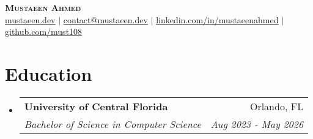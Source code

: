 \documentclass[letterpaper,11pt]{article}
\makeatletter
\newcommand{\resumeSubheading}[4]{
  \vspace{-2pt}\item
    \begin{tabular*}{0.97\textwidth}[t]{l@{\extracolsep{\fill}}r}
      \textbf{#1} & #2 \\
      \textit{\small#3} & \textit{\small #4} \\
    \end{tabular*}\vspace{-7pt}
}
\newcommand{\resumeSubHeadingListStart}{\begin{itemize}[leftmargin=0.15in, label={}]}
\newcommand{\resumeSubHeadingListEnd}{\end{itemize}}
\makeatother
\begin{document}

\vspace*{-0.65in} %
\begin{center}
    \textbf{\Huge \scshape Mustaeen Ahmed} \\ \vspace{1pt}
    \href{https://mustaeen.dev}{\ul{mustaeen.dev}} $|$ 
    \href{mailto:contact@mustaeen.dev}{\ul{contact@mustaeen.dev}} $|$ 
    \href{https://linkedin.com/in/mustaeenahmed}{\ul{linkedin.com/in/mustaeenahmed}} $|$
    \href{https://github.com/must108}{\ul{github.com/must108}} 
\end{center}


\vspace*{-0.2in} %
\section{Education}
  \resumeSubHeadingListStart
    \resumeSubheading
      {University of Central Florida}{Orlando, FL}
      {Bachelor of Science in Computer Science}{Aug 2023 - May 2026}
      
  \resumeSubHeadingListEnd

\end{document}
